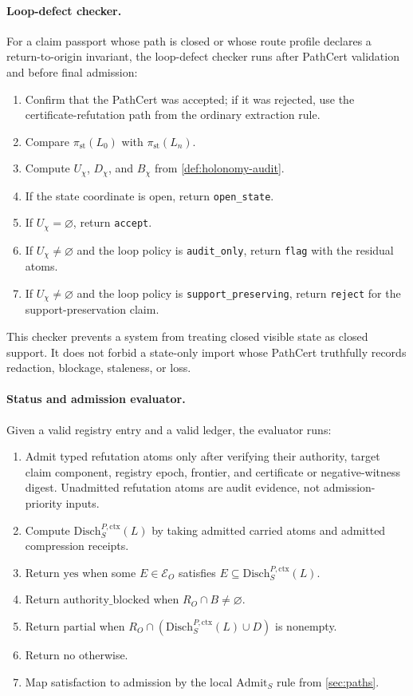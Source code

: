 \documentclass[11pt,twoside]{article}
\theoremstyle{definition}
\newcommand{\Admit}{\mathrm{Admit}}
\newcommand{\Disch}{\mathrm{Disch}}
\newcommand{\ctx}{\mathrm{ctx}}
\newcommand{\authorityblocked}{\mathrm{authority\_blocked}}
\begin{document}
\paragraph{Loop-defect checker.}
For a claim passport whose path is closed or whose route profile declares a
return-to-origin invariant, the loop-defect checker runs after PathCert
validation and before final admission:
\begin{enumerate}[leftmargin=*]
  \item Confirm that the PathCert was accepted; if it was rejected, use the
        certificate-refutation path from the ordinary extraction rule.
  \item Compare $\pi_{\mathrm{st}}(L_0)$ with $\pi_{\mathrm{st}}(L_n)$.
  \item Compute $U_\chi$, $D_\chi$, and $B_\chi$ from
        \cref{def:holonomy-audit}.
  \item If the state coordinate is open, return \texttt{open\_state}.
  \item If $U_\chi=\varnothing$, return \texttt{accept}.
  \item If $U_\chi\neq\varnothing$ and the loop policy is
        \texttt{audit\_only}, return \texttt{flag} with the residual atoms.
  \item If $U_\chi\neq\varnothing$ and the loop policy is
        \texttt{support\_preserving}, return \texttt{reject} for the
        support-preservation claim.
\end{enumerate}
This checker prevents a system from treating closed visible state as closed
support. It does not forbid a state-only import whose PathCert truthfully records
redaction, blockage, staleness, or loss.

\paragraph{Status and admission evaluator.}
Given a valid registry entry and a valid ledger, the evaluator runs:
\begin{enumerate}[leftmargin=*]
  \item Admit typed refutation atoms only after verifying their authority,
        target claim component, registry epoch, frontier, and certificate or
        negative-witness digest. Unadmitted refutation atoms are audit evidence,
        not admission-priority inputs.
  \item Compute $\Disch_S^{P,\ctx}(L)$ by taking admitted carried atoms and
        admitted compression receipts.
  \item Return $\mathrm{yes}$ when some $E\in\mathcal E_O$ satisfies
        $E\subseteq\Disch_S^{P,\ctx}(L)$.
  \item Return $\authorityblocked$ when $R_O\cap B\neq\varnothing$.
  \item Return $\mathrm{partial}$ when $R_O\cap(\Disch_S^{P,\ctx}(L)\cup D)$ is
        nonempty.
  \item Return $\mathrm{no}$ otherwise.
  \item Map satisfaction to admission by the local $\Admit_S$ rule from
        \cref{sec:paths}.
\end{enumerate}
\end{document}
